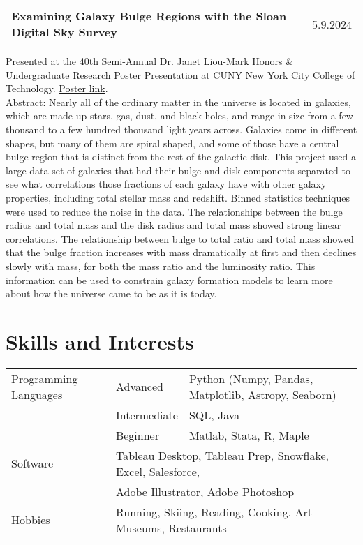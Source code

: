 \documentclass[a4paper,12pt]{article}
\makeatletter
\newenvironment{jobshort}[2]
    {
    \begin{tabularx}{\linewidth}{@{}X r@{}}
    {\raggedright\arraybackslash\nohyphens{#1}} & #2 \\[3.75pt]
    \end{tabularx}
    }
    {}
\makeatother
\begin{document}
\begin{jobshort}{\textbf{Examining Galaxy Bulge Regions with the Sloan Digital Sky Survey}}{5.9.2024}
Presented at the 40th Semi-Annual Dr. Janet Liou-Mark Honors \& Undergraduate Research Poster Presentation at CUNY New York City College of Technology. \href{https://academicworks.cuny.edu/ny_pubs/1137/}{Poster link}.\\
Abstract: Nearly all of the ordinary matter in the universe is located in galaxies, which are made up stars, gas, dust, and black holes, and range in size from a few thousand to a few hundred thousand light years across. Galaxies come in different shapes, but many of them are spiral shaped, and some of those have a central bulge region that is distinct from the rest of the galactic disk. This project used a large data set of galaxies that had their bulge and disk components separated to see what correlations those fractions of each galaxy have with other galaxy properties, including total stellar mass and redshift. Binned statistics techniques were used to reduce the noise in the data. The relationships between the bulge radius and total mass and the disk radius and total mass showed strong linear correlations. The relationship between bulge to total ratio and total mass showed that the bulge fraction increases with mass dramatically at first and then declines slowly with mass, for both the mass ratio and the luminosity ratio. This information can be used to constrain galaxy formation models to learn more about how the universe came to be as it is today.
\end{jobshort}

\section{Skills and Interests}
\begin{tabularx}{\linewidth}{@{}l l X@{}}
Programming Languages & Advanced & \normalsize{Python (Numpy, Pandas, Matplotlib, Astropy, Seaborn)}\\
 & Intermediate & \normalsize{SQL, Java}\\
 & Beginner & \normalsize{Matlab, Stata, R, Maple}\\
Software & \multicolumn{2}{l}{\normalsize{Tableau Desktop, Tableau Prep, Snowflake, Excel, Salesforce, }}\\
& \multicolumn{2}{l}{\normalsize{Adobe Illustrator, Adobe Photoshop}}\\
Hobbies & \multicolumn{2}{l}{\normalsize{Running, Skiing, Reading, Cooking, Art Museums, Restaurants}}\\

\end{tabularx}

\vfill
{}
\end{document}
